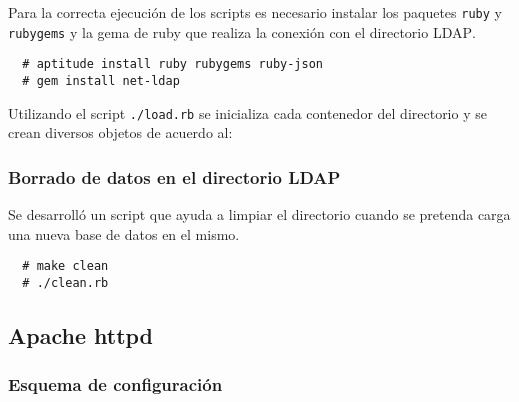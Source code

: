 Para la correcta ejecuci\'{o}n de los scripts es necesario instalar los paquetes \texttt{ruby} y \texttt{rubygems} y la gema de ruby que realiza la conexi\'{o}n con el directorio \textsc{LDAP}.

{
\scriptsize
\linespread{1}
\begin{verbatim}
  # aptitude install ruby rubygems ruby-json
  # gem install net-ldap
\end{verbatim}
}

Utilizando el script \texttt{./load.rb} se inicializa cada contenedor del directorio y se crean diversos objetos de acuerdo al:

{
\begin{table}[H]
\caption{Script de carga de objetos en el directorio}{}
\label{tab:load-rb}
\noindent{} %
\end{table}
}

          \subsubsection {Borrado de datos en el directorio \textsc{LDAP}}

Se desarroll\'{o} un script que ayuda a limpiar el directorio cuando se pretenda carga una nueva base de datos en el mismo.

{
\scriptsize
\linespread{1}
\begin{verbatim}
  # make clean
  # ./clean.rb
\end{verbatim}
}

      \subsection {Apache httpd}

        \subsubsection {Esquema de configuraci\'{o}n}

